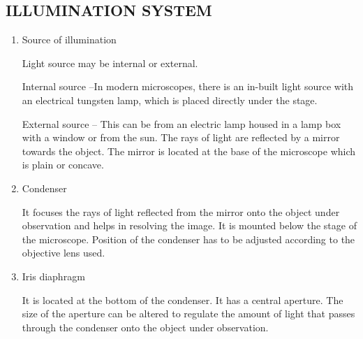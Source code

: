 \documentclass[12pt]{book}
\begin{document}
		\subsection{ILLUMINATION SYSTEM}
		\begin{enumerate}

		\item{Source of illumination \newline
			\par Light source may be internal or external.
				\par Internal source –In modern microscopes, there is an in-built light source with an electrical tungsten lamp, which is placed directly under the stage.
				\par External source – This can be from an electric lamp housed in a lamp box with a window or from the sun. The rays of light are reflected by a mirror towards the object. The mirror is located at the base of the microscope which is plain or concave.}
				\item{Condenser
					\par It focuses the rays of light reflected from the mirror onto the object under observation and helps in resolving the image. It is mounted below the stage of the microscope. Position of the condenser has to be adjusted according to the objective lens used.}
					\item{Iris diaphragm
						\par It is located at the bottom of the condenser. It has a central aperture. The size of the aperture can be altered to regulate the amount of light that passes through the condenser onto the object under observation.}
						\end{enumerate}
\end{document}
